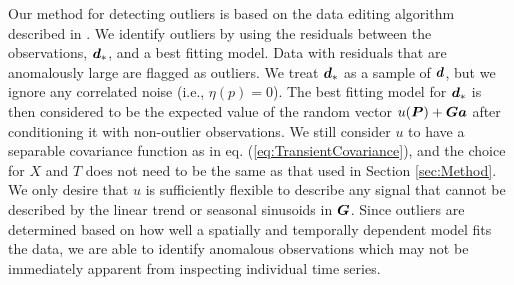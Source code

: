 \documentclass[extra,mreferee]{gji}
\begin{document}
Our method for detecting outliers is based on the data editing algorithm described in \citet{Acheson1975}. We identify outliers by using the residuals between the observations, $\mitbf{d}_*$, and a best fitting model. Data with residuals that are anomalously large are flagged as outliers. We treat $\mitbf{d}_*$ as a sample of $\mitbf{d}$, but we ignore any correlated noise (i.e., $\eta(p) = 0$).  The best fitting model for $\mitbf{d}_*$ is then considered to be the expected value of the random vector $u(\mitbf{P}) + \mitbf{G}\mitbf{a}$ after conditioning it with non-outlier observations.  We still consider $u$ to have a separable covariance function as in eq. (\ref{eq:TransientCovariance}), and the choice for $X$ and $T$ does not need to be the same as that used in Section \ref{sec:Method}. We only desire that $u$ is sufficiently flexible to describe any signal that cannot be described by the linear trend or seasonal sinusoids in $\mitbf{G}$. Since outliers are determined based on how well a spatially and temporally dependent model fits the data, we are able to identify anomalous observations which may not be immediately apparent from inspecting individual time series. 
\end{document}
